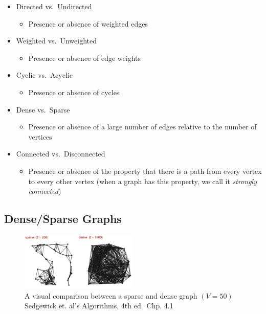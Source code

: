 \documentclass[
  10pt,
  english,
  letterpaper,
,tablecaptionabove
]{scrartcl}
\providecommand{\tightlist}{%
  \setlength{\itemsep}{0pt}\setlength{\parskip}{0pt}}
\begin{document}
\begin{itemize}
\tightlist
\item
  Directed vs.~Undirected

  \begin{itemize}
  \tightlist
  \item
    Presence or absence of weighted edges
  \end{itemize}
\item
  Weighted vs.~Unweighted

  \begin{itemize}
  \tightlist
  \item
    Presence or absence of edge weights
  \end{itemize}
\item
  Cyclic vs.~Acyclic

  \begin{itemize}
  \tightlist
  \item
    Presence or absence of cycles
  \end{itemize}
\item
  Dense vs.~Sparse

  \begin{itemize}
  \tightlist
  \item
    Presence or absence of a large number of edges relative to the
    number of vertices
  \end{itemize}
\item
  Connected vs.~Disconnected

  \begin{itemize}
  \tightlist
  \item
    Presence or absence of the property that there is a path from every
    vertex to every other vertex (when a graph has this property, we
    call it \emph{strongly connected})
  \end{itemize}
\end{itemize}

\hypertarget{densesparse-graphs}{%
\subsection{Dense/Sparse Graphs}\label{densesparse-graphs}}

\begin{figure}
\centering
\includegraphics[width=0.5\textwidth,height=\textheight]{images/1.png}
\caption{A visual comparison between a sparse and dense graph
\((V = 50)\) Sedgewick et. al's Algorithms, 4th ed.~Chp. 4.1}
\end{figure}
\end{document}
